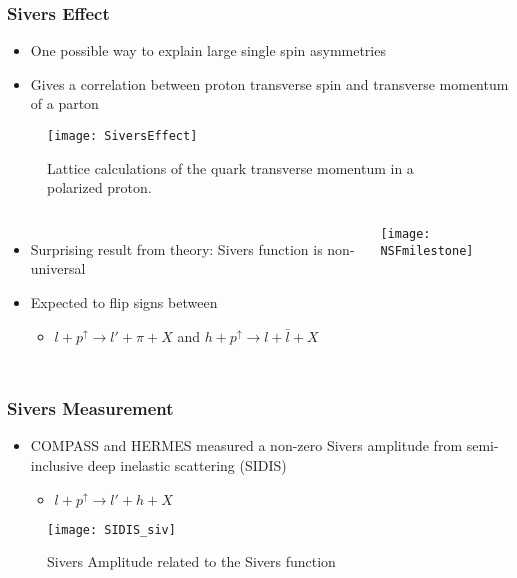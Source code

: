 \begin{frame}
  \frametitle{Sivers Effect}

  \begin{itemize}
  \item One possible way to explain large single spin asymmetries
  \item Gives a correlation between proton transverse spin and transverse momentum of a parton
  \end{itemize}

  \setlength\abovecaptionskip{-5pt}
  \setlength{\belowcaptionskip}{-10pt}
  \begin{figure}
    \vspace*{-0.3cm}
    \centering
    \texttt{[image: SiversEffect]}
    \caption{Lattice calculations of the quark transverse momentum in a polarized proton.}
  \end{figure}

  \begin{columns}
    \begin{itemize}
    \item Surprising result from theory: Sivers function is non-universal
    \item Expected to flip signs between
      \begin{itemize}
      \item [] $l+p^{\uparrow} \rightarrow l'+\pi+X$ and $h+p^{\uparrow} \rightarrow l+\bar{l}+X$
      \end{itemize}
    \end{itemize}
    \pause
    \texttt{[image: NSFmilestone]}
  \end{columns}
\end{frame}


\begin{frame}
  \frametitle{Sivers Measurement}

  \begin{itemize}
  \item COMPASS and HERMES measured a non-zero Sivers amplitude from
    semi-inclusive deep inelastic scattering (SIDIS)
    \begin{itemize}
      \item [] $l+p^{\uparrow} \rightarrow l'+h+X$
    \end{itemize}
  \end{itemize}

  \begin{figure}
    \centering
    \texttt{[image: SIDIS\_siv]}
    \caption{Sivers Amplitude related to the Sivers function}
  \end{figure}
\end{frame}


